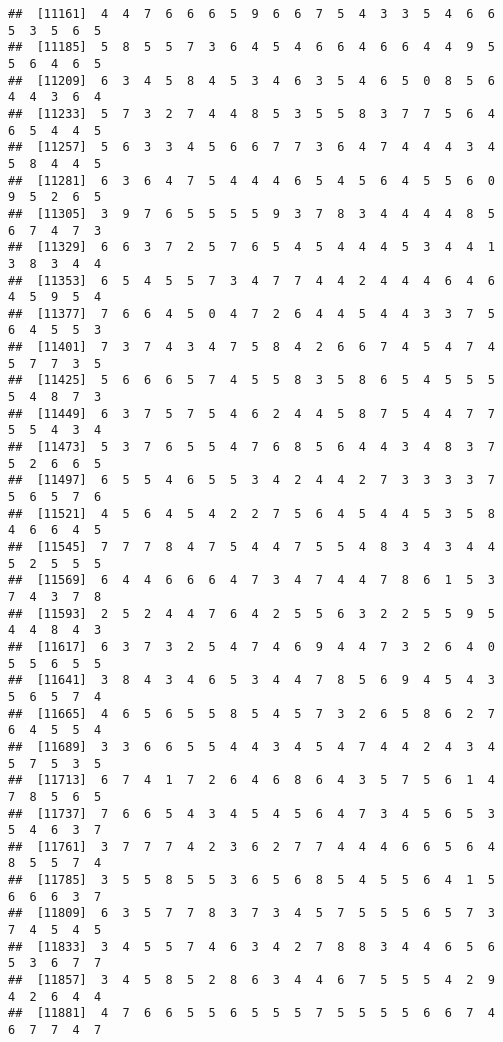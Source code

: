 \documentclass[
]{book}
\begin{document}
\begin{verbatim}
##  [11161]  4  4  7  6  6  6  5  9  6  6  7  5  4  3  3  5  4  6  6  5  3  5  6  5
##  [11185]  5  8  5  5  7  3  6  4  5  4  6  6  4  6  6  4  4  9  5  5  6  4  6  5
##  [11209]  6  3  4  5  8  4  5  3  4  6  3  5  4  6  5  0  8  5  6  4  4  3  6  4
##  [11233]  5  7  3  2  7  4  4  8  5  3  5  5  8  3  7  7  5  6  4  6  5  4  4  5
##  [11257]  5  6  3  3  4  5  6  6  7  7  3  6  4  7  4  4  4  3  4  5  8  4  4  5
##  [11281]  6  3  6  4  7  5  4  4  4  6  5  4  5  6  4  5  5  6  0  9  5  2  6  5
##  [11305]  3  9  7  6  5  5  5  5  9  3  7  8  3  4  4  4  4  8  5  6  7  4  7  3
##  [11329]  6  6  3  7  2  5  7  6  5  4  5  4  4  4  5  3  4  4  1  3  8  3  4  4
##  [11353]  6  5  4  5  5  7  3  4  7  7  4  4  2  4  4  4  6  4  6  4  5  9  5  4
##  [11377]  7  6  6  4  5  0  4  7  2  6  4  4  5  4  4  3  3  7  5  6  4  5  5  3
##  [11401]  7  3  7  4  3  4  7  5  8  4  2  6  6  7  4  5  4  7  4  5  7  7  3  5
##  [11425]  5  6  6  6  5  7  4  5  5  8  3  5  8  6  5  4  5  5  5  5  4  8  7  3
##  [11449]  6  3  7  5  7  5  4  6  2  4  4  5  8  7  5  4  4  7  7  5  5  4  3  4
##  [11473]  5  3  7  6  5  5  4  7  6  8  5  6  4  4  3  4  8  3  7  5  2  6  6  5
##  [11497]  6  5  5  4  6  5  5  3  4  2  4  4  2  7  3  3  3  3  7  5  6  5  7  6
##  [11521]  4  5  6  4  5  4  2  2  7  5  6  4  5  4  4  5  3  5  8  4  6  6  4  5
##  [11545]  7  7  7  8  4  7  5  4  4  7  5  5  4  8  3  4  3  4  4  5  2  5  5  5
##  [11569]  6  4  4  6  6  6  4  7  3  4  7  4  4  7  8  6  1  5  3  7  4  3  7  8
##  [11593]  2  5  2  4  4  7  6  4  2  5  5  6  3  2  2  5  5  9  5  4  4  8  4  3
##  [11617]  6  3  7  3  2  5  4  7  4  6  9  4  4  7  3  2  6  4  0  5  5  6  5  5
##  [11641]  3  8  4  3  4  6  5  3  4  4  7  8  5  6  9  4  5  4  3  5  6  5  7  4
##  [11665]  4  6  5  6  5  5  8  5  4  5  7  3  2  6  5  8  6  2  7  6  4  5  5  4
##  [11689]  3  3  6  6  5  5  4  4  3  4  5  4  7  4  4  2  4  3  4  5  7  5  3  5
##  [11713]  6  7  4  1  7  2  6  4  6  8  6  4  3  5  7  5  6  1  4  7  8  5  6  5
##  [11737]  7  6  6  5  4  3  4  5  4  5  6  4  7  3  4  5  6  5  3  5  4  6  3  7
##  [11761]  3  7  7  7  4  2  3  6  2  7  7  4  4  4  6  6  5  6  4  8  5  5  7  4
##  [11785]  3  5  5  8  5  5  3  6  5  6  8  5  4  5  5  6  4  1  5  6  6  6  3  7
##  [11809]  6  3  5  7  7  8  3  7  3  4  5  7  5  5  5  6  5  7  3  7  4  5  4  5
##  [11833]  3  4  5  5  7  4  6  3  4  2  7  8  8  3  4  4  6  5  6  5  3  6  7  7
##  [11857]  3  4  5  8  5  2  8  6  3  4  4  6  7  5  5  5  4  2  9  4  2  6  4  4
##  [11881]  4  7  6  6  5  5  6  5  5  5  7  5  5  5  5  6  6  7  4  6  7  7  4  7

\end{verbatim}
\end{document}
